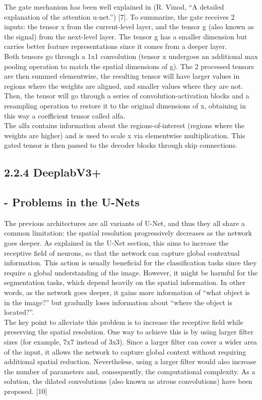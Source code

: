 The gate mechanism has been well explained in (R. Vinod, “A detailed explanation of the attention u-net.”) [7]. To summarize, the gate receives 2 inputs: the tensor x from the current-level layer, and the tensor g (also known as the signal) from the next-level layer. The tensor g has a smaller dimension but carries better feature representations since it comes from a deeper layer.\\

Both tensors go through a 1x1 convolution (tensor x undergoes an additional max pooling operation to match the spatial dimensions of g). The 2 processed tensors are then summed elementwise, the resulting tensor will have larger values in regions where the weights are aligned, and smaller values where they are not. Then, the tensor will go through a series of convolution-activation blocks and a resampling operation to restore it to the original dimensions of x, obtaining in this way a coefficient tensor called alfa.\\ 

The alfa contains information about the regions-of-interest (regions where the weights are higher) and is used to scale x via elementwise multiplication. This gated tensor is then passed to the decoder blocks through skip connections.\\

\subsection{2.2.4 DeeplabV3+}
\subsection{- Problems in the U-Nets }
The previous architectures are all variants of U-Net, and thus they all share a common limitation: the spatial resolution progressively decreases as the network goes deeper. As explained in the U-Net section, this aims to increase the receptive field of neurons, so that the network can capture global contextual information. This action is usually beneficial for the classification tasks since they require a global understanding of the image. However, it might be harmful for the segmentation tasks, which depend heavily on the spatial information. In other words, as the network goes deeper, it gains more information of “what object is in the image?” but gradually loses information about “where the object is located?”.\\

The key point to alleviate this problem is to increase the receptive field while preserving the spatial resolution. One way to achieve this is by using larger filter sizes (for example, 7x7 instead of 3x3). Since a larger filter can cover a wider area of the input, it allows the network to capture global context without requiring additional spatial reduction. Nevertheless, using a larger filter would also increase the number of parameters and, consequently, the computational complexity. As a solution, the dilated convolutions (also known as atrous convolutions) have been proposed. [10]\\

